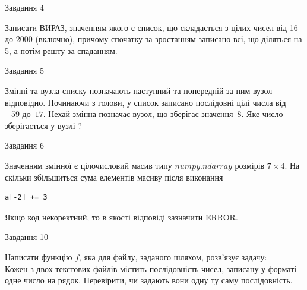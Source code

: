 \documentclass[12pt, ukrainian]{article}
\begin{document}
{\begin{minipage}[t]{8.0cm}
\begin{verbatim}
\end{verbatim}            

\end{minipage}


               
{\begin{center}Завдання {4}\end{center}}
\vspace{-4mm}

Записати ВИРАЗ, значенням якого є список, що складається з цілих чисел від 16 до 2000 (включно), причому спочатку за зростанням записано всі, що діляться на 5, а потім решту за спаданням.\par

\vspace{10mm}
               
{\begin{center}Завдання {5}\end{center}}
\vspace{-4mm}
Змінні  та  вузла списку позначають наступний та попередній за ним вузол відповідно. Починаючи з голови, у список записано послідовні цілі числа від~$-59$ до~$17$. Нехай змінна  позначає вузол, що зберігає значення~$8$.
Яке число зберігається у вузлі  ?\par

               
{\begin{center}Завдання {6}\end{center}}
\vspace{-4mm}
Значенням змінної  є цілочисловий масив типу $numpy.ndarray$ розмірів $7{\times}4$. На скільки збільшиться сума елементів масиву  після виконання
\begin{verbatim}
a[-2] += 3
\end{verbatim}


Якщо код некоректний, то в якості відповіді зазначити ERROR.\par

               
{\begin{center}Завдання {10}\end{center}}
\vspace{-4mm}

Написати функцію $f$, яка для файлу, заданого шляхом, розв’язує задачу:\\ Кожен з двох текстових файлів містить послідовність чисел, записану у форматі одне число на рядок.  Перевірити, чи задають вони одну ту саму послідовність.

}
\end{document}
